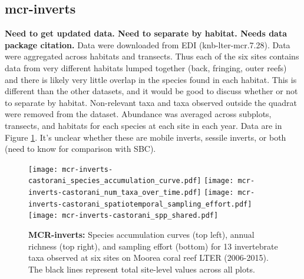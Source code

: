 \documentclass[11pt, oneside]{article}
\begin{document}
\subsection {mcr-inverts}
{\bf Need to get updated data. Need to separate by habitat. Needs data package citation.}
Data were downloaded from EDI (knb-lter-mcr.7.28).
Data were aggregated across habitats and transects.
Thus each of the six sites contains data from very different habitats lumped together (back, fringing, outer reefs) and there is likely very little overlap in the species found in each habitat. 
This is different than the other datasets, and it would be good to discuss whether or not to separate by habitat.
Non-relevant taxa and taxa observed outside the quadrat were removed from the dataset.
Abundance was averaged across subplots, transects, and habitats for each species at each site in each year.
Data are in Figure \ref{mcr-inverts}.
It's unclear whether these are mobile inverts, sessile inverts, or both (need to know for comparison with SBC).
\begin{figure}[h!]
\centering
\texttt{[image: mcr-inverts-castorani\_species\_accumulation\_curve.pdf]}
\texttt{[image: mcr-inverts-castorani\_num\_taxa\_over\_time.pdf]}
\texttt{[image: mcr-inverts-castorani\_spatiotemporal\_sampling\_effort.pdf]}
\texttt{[image: mcr-inverts-castorani\_spp\_shared.pdf]}
\caption{{\bf MCR-inverts:} Species accumulation curves (top left),  annual richness (top right), and sampling effort (bottom)  for 13 invertebrate taxa observed at six sites on Moorea coral reef LTER (2006-2015). The black lines represent total site-level values across all plots.}
\label{mcr-inverts}
\end{figure}
\end{document}
